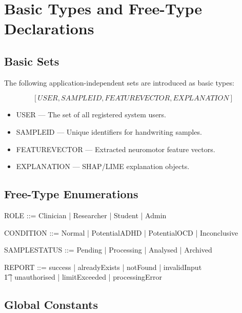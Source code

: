 \documentclass[12pt,a4paper]{article}
\begin{document}
\section{Basic Types and Free-Type Declarations}

\subsection{Basic Sets}

The following application-independent sets are introduced as basic types:

\[
[USER, SAMPLEID, FEATUREVECTOR, EXPLANATION]
\]

\begin{itemize}
    \item USER — The set of all registered system users.
    \item SAMPLEID — Unique identifiers for handwriting samples.
    \item FEATUREVECTOR — Extracted neuromotor feature vectors.
    \item EXPLANATION — SHAP/LIME explanation objects.
\end{itemize}

\subsection{Free-Type Enumerations}

\begin{zed}
ROLE ::= Clinician | Researcher | Student | Admin
\end{zed}

\begin{zed}
CONDITION ::= Normal | PotentialADHD | PotentialOCD | Inconclusive
\end{zed}

\begin{zed}
SAMPLESTATUS ::= Pending | Processing | Analysed | Archived
\end{zed}

\begin{zed}
REPORT ::= success | alreadyExists | notFound | invalidInput \\
\t1 | unauthorised | limitExceeded | processingError
\end{zed}

\subsection{Global Constants}
\end{document}
